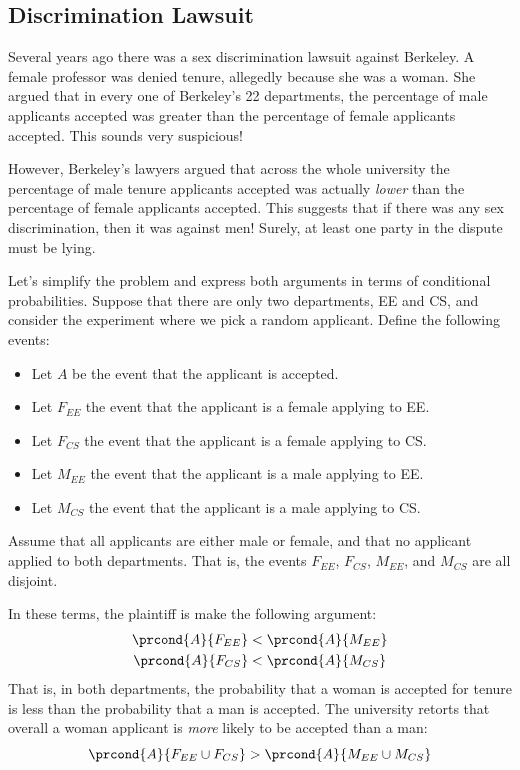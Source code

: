 \subsection{Discrimination Lawsuit}\label{discrimination_subsec}

Several years ago there was a sex discrimination lawsuit against
Berkeley.  A female professor was denied tenure, allegedly because she
was a woman.  She argued that in every one of Berkeley's 22
departments, the percentage of male applicants accepted was greater
than the percentage of female applicants accepted.  This sounds very
suspicious!

However, Berkeley's lawyers argued that across the whole university
the percentage of male tenure applicants accepted was actually
\textit{lower} than the percentage of female applicants accepted.
This suggests that if there was any sex discrimination, then it was
against men!  Surely, at least one party in the dispute must be lying.

Let's simplify the problem and express both arguments in terms of
conditional probabilities.  Suppose that there are only two
departments, EE and CS, and consider the experiment where we pick a
random applicant.  Define the following events:
%
\begin{itemize}
\item Let $A$ be the event that the applicant is accepted.
\item Let $F_{EE}$ the event that the applicant is a female applying to EE.
\item Let $F_{CS}$ the event that the applicant is a female applying to CS.
\item Let $M_{EE}$ the event that the applicant is a male applying to EE.
\item Let $M_{CS}$ the event that the applicant is a male applying to
CS.
\end{itemize}
%
Assume that all applicants are either male or female, and that no
applicant applied to both departments.  That is, the events $F_{EE}$,
$F_{CS}$, $M_{EE}$, and $M_{CS}$ are all disjoint.

In these terms, the plaintiff is make the following argument:
%
\begin{align*}
\prcond{A}{F_{EE}} & < \prcond{A}{M_{EE}} \\
\prcond{A}{F_{CS}} & < \prcond{A}{M_{CS}}
\end{align*}
%
That is, in both departments, the probability that a woman is accepted
for tenure is less than the probability that a man is accepted.  The
university retorts that overall a woman applicant is \textit{more}
likely to be accepted than a man:
%
\[
\prcond{A}{F_{EE} \cup F_{CS}} > \prcond{A}{M_{EE} \cup M_{CS}}
\]

